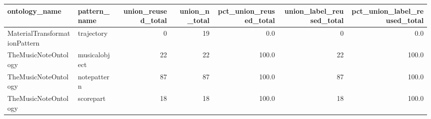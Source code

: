 \begin{tabular}{llrrrrr}
\toprule
ontology_name & pattern_name & union_reused_total & union_n_total & pct_union_reused_total & union_label_reused_total & pct_union_label_reused_total \\
\midrule
MaterialTransformationPattern & trajectory & 0 & 19 & 0.0 & 0 & 0.0 \\
TheMusicNoteOntology & musicalobject & 22 & 22 & 100.0 & 22 & 100.0 \\
TheMusicNoteOntology & notepattern & 87 & 87 & 100.0 & 87 & 100.0 \\
TheMusicNoteOntology & scorepart & 18 & 18 & 100.0 & 18 & 100.0 \\
\bottomrule
\end{tabular}
